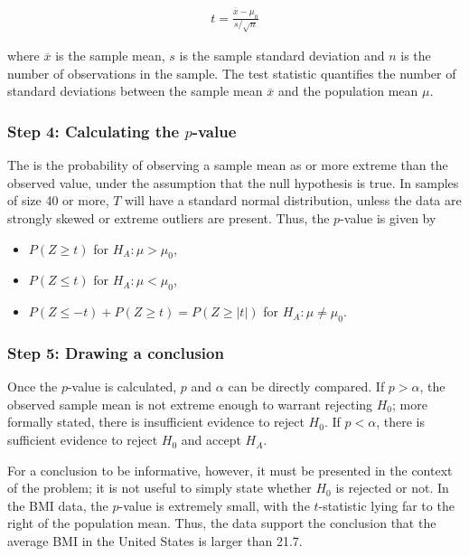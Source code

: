 \begin{spacing}{1.5}
\begin{align}
t=\frac{\overline{x}-\mu_0}{s/\sqrt{n}}
\end{align}

where $\overline{x}$ is the sample mean, $s$ is the sample standard deviation and $n$ is the number of observations in the sample. The test statistic quantifies the number of standard deviations between the sample mean $\overline{x}$ and the population mean $\mu$.

\subsubsection{Step 4: Calculating the $p$-value}

The  is the probability of observing a sample mean as or more extreme than the observed value, under the assumption that the null hypothesis is true. In samples of size 40 or more, $T$ will have a standard normal distribution, unless the data are strongly skewed or extreme outliers are present. Thus, the $p$-value is given by

\begin{itemize}
	\item $P(Z \geq t)$ for $H_A: \mu > \mu_0$,
	
	\item $P(Z \leq t)$ for $H_A: \mu < \mu_0$,
	
	\item $P(Z \leq -t) + P(Z \geq t) = P(Z \geq |t| )$ for $H_A: \mu \neq \mu_0.$
\end{itemize}

\subsubsection{Step 5: Drawing a conclusion}

Once the $p$-value is calculated, $p$ and $\alpha$ can be directly compared. If $p > \alpha$, the observed sample mean is not extreme enough to warrant rejecting $H_0$; more formally stated, there is insufficient evidence to reject $H_0$. If $p < \alpha$, there is sufficient evidence to reject $H_0$ and accept $H_A$. 

For a conclusion to be informative, however, it must be presented in the context of the problem; it is not useful to simply state whether $H_0$ is rejected or not. In the  BMI data, the $p$-value is extremely small, with the $t$-statistic lying far to the right of the population mean. Thus, the data support the conclusion that the average BMI in the United States is larger than 21.7. 


\end{spacing}
